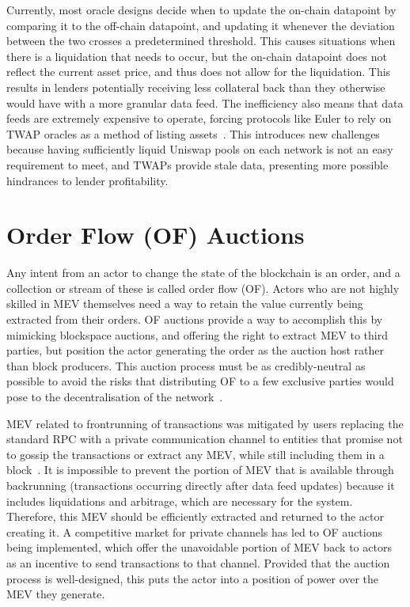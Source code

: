 \documentclass[11pt]{article}
\begin{document}
Currently, most oracle designs decide when to update the on-chain datapoint by comparing it to the off-chain datapoint, and updating it whenever the deviation between the two crosses a predetermined threshold.
This causes situations when there is a liquidation that needs to occur, but the on-chain datapoint does not reflect the current asset price, and thus does not allow for the liquidation.
This results in lenders potentially receiving less collateral back than they otherwise would have with a more granular data feed.
The inefficiency also means that data feeds are extremely expensive to operate, forcing protocols like Euler to rely on TWAP oracles as a method of listing assets~\cite{euler}.
This introduces new challenges because having sufficiently liquid Uniswap pools on each network is not an easy requirement to meet, and TWAPs provide stale data, presenting more possible hindrances to lender profitability.

\section{Order Flow (OF) Auctions}

Any intent from an actor to change the state of the blockchain is an order, and a collection or stream of these is called order flow (OF).
Actors who are not highly skilled in MEV themselves need a way to retain the value currently being extracted from their orders.
OF auctions provide a way to accomplish this by mimicking blockspace auctions, and offering the right to extract MEV to third parties, but position the actor generating the order as the auction host rather than block producers.
This auction process must be as credibly-neutral as possible to avoid the risks that distributing OF to a few exclusive parties would pose to the decentralisation of the network~\cite{flashbots-centralization-1}.

MEV related to frontrunning of transactions was mitigated by users replacing the standard RPC with a private communication channel to entities that promise not to gossip the transactions or extract any MEV, while still including them in a block~\cite{flashbots-protect}.
It is impossible to prevent the portion of MEV that is available through backrunning (transactions occurring directly after data feed updates) because it includes liquidations and arbitrage, which are necessary for the system.
Therefore, this MEV should be efficiently extracted and returned to the actor creating it.
A competitive market for private channels has led to OF auctions being implemented, which offer the unavoidable portion of MEV back to actors as an incentive to send transactions to that channel.
Provided that the auction process is well-designed, this puts the actor into a position of power over the MEV they generate. 
\end{document}
